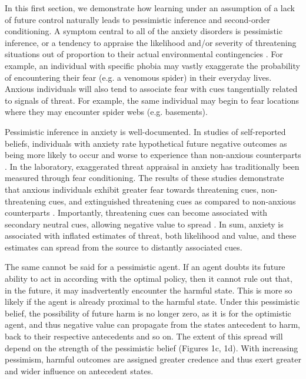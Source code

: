 \documentclass[11pt]{article} %
\begin{document}
In this first section, we demonstrate how learning under an assumption of a lack of future control naturally leads to pessimistic inference and second-order conditioning. A symptom central to all of the anxiety disorders is pessimistic inference, or a tendency to appraise the likelihood and/or severity of threatening situations out of proportion to their actual environmental contingencies \citep{dsm5, BeckClark1997, ClarkBeck2011}. For example, an individual with specific phobia may vastly exaggerate the probability of encountering their fear (e.g. a venomous spider) in their everyday lives. Anxious individuals will also tend to associate fear with cues tangentially related to signals of threat. For example, the same individual may begin to fear locations where they may encounter spider webs (e.g. basements).

Pessimistic inference in anxiety is well-documented. In studies of self-reported beliefs, individuals with anxiety rate hypothetical future negative outcomes as being more likely to occur and worse to experience than non-anxious counterparts \citep{ButlerMathews1983, ButlerMathews1987, Foa1996, MacLeod1996, MacLeod1997, Luten1997, Stober1997, Borkovec1999, Maner2006, Mitte2007, Miranda2007}. In the laboratory, exaggerated threat appraisal in anxiety has traditionally been measured through fear conditioning. The results of these studies demonstrate that anxious individuals exhibit greater fear towards threatening cues, non-threatening cues, and extinguished threatening cues as compared to non-anxious counterparts \citep{lissek2005, MinekaOehlberg2008, Duits2015}. Importantly, threatening cues can become associated with secondary neutral cues, allowing negative value to spread \citep{wessa2007}. In sum, anxiety is associated with inflated estimates of threat, both likelihood and value, and these estimates can spread from the source to distantly associated cues.



The same cannot be said for a pessimistic agent. If an agent doubts its future ability to act in according with the optimal policy, then it cannot rule out that, in the future, it may inadvertently encounter the harmful state. This is more so likely if the agent is already proximal to the harmful state. Under this pessimistic belief, the possibility of future harm is no longer zero, as it is for the optimistic agent, and thus negative value can propagate from the states antecedent to harm, back to their respective antecedents and so on. The extent of this spread will depend on the strength of the pessimistic belief (Figures 1c, 1d). With increasing pessimism, harmful outcomes are assigned greater credence and thus exert greater and wider influence on antecedent states.
\end{document}
